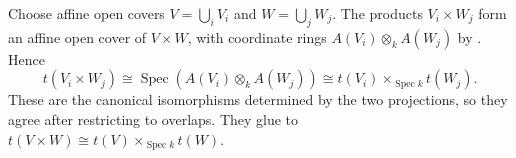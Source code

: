 Choose affine open covers $V=\bigcup_iV_i$ and $W=\bigcup_jW_j$. The products $V_i\times W_j$ form an affine open cover of $V\times W$, with coordinate rings $A(V_i)\otimes_kA(W_j)$ by . Hence
\[t(V_i\times W_j)\cong\operatorname{Spec}(A(V_i)\otimes_kA(W_j))\cong t(V_i)\times_{\operatorname{Spec}k}t(W_j).\]
These are the canonical isomorphisms determined by the two projections, so they agree after restricting to overlaps. They glue to $t(V\times W)\cong t(V)\times_{\operatorname{Spec}k}t(W)$.
